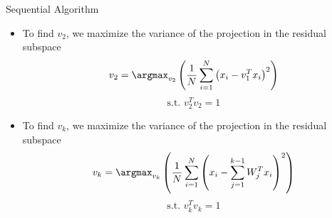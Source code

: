 \documentclass[serif, aspectratio=169]{beamer}
\begin{document}

\begin{frame}{Sequential Algorithm}
    \begin{itemize}
        \item To find $v_2$, we maximize the variance of the projection in the residual subspace
$$
v_2 = \argmax_{v_2} \left( \frac{1}{N} \sum_{i=1}^{N} \left( x_i - v_1^T x_i \right)^2 \right)
$$
$$ \text{s.t. } v_2^{T}{v_2}  = 1$$
          \item To find $v_k$, we maximize the variance of the projection in the residual subspace
$$
v_k = \argmax_{v_k} \left( \frac{1}{N} \sum_{i=1}^{N} \left( x_i - \sum_{j=1}^{k-1} W_j^T x_i \right)^2 \right)
$$      
$$\text{s.t. } v_k^{T}{v_k}  = 1$$
    \end{itemize}
\end{frame}


\end{document}
